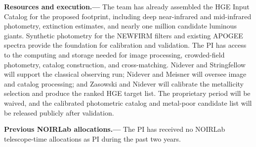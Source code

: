 \documentclass[11pt]{article}
\begin{document}
\textbf{Resources and execution.---}
The team has already assembled the HGE Input Catalog for the proposed
footprint, including deep near-infrared and mid-infrared photometry, extinction
estimates, and nearly one million candidate luminous giants. Synthetic
photometry for the NEWFIRM filters and existing APOGEE spectra provide the
foundation for calibration and validation. The PI has access to the computing
and storage needed for image processing, crowded-field photometry, catalog
construction, and cross-matching. Nidever and Stringfellow will support the
classical observing run; Nidever and Meisner will oversee image and catalog
processing; and Zasowski and Nidever will calibrate the metallicity selection
and produce the ranked HGE target list. The proprietary period will be waived,
and the calibrated photometric catalog and metal-poor candidate list will be
released publicly after validation.

\textbf{Previous NOIRLab allocations.---}
The PI has received no NOIRLab telescope-time allocations as PI during the
past two years.
\end{document}
